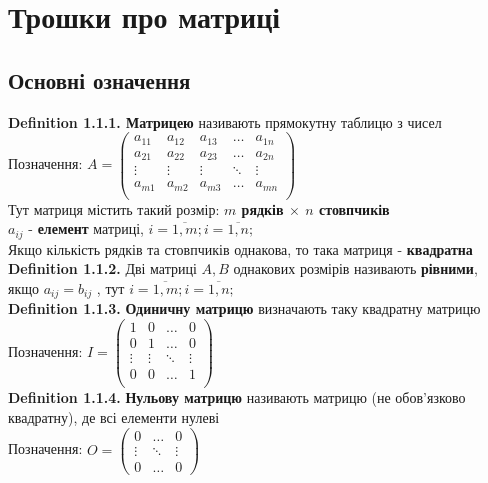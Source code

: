 \documentclass[a4paper, 10pt]{article}
\def\defin#1{\textbf{Definition {#1}}}
\theoremstyle{theoremdd}
\theoremstyle{theoremdd}
\theoremstyle{theoremdd}
\theoremstyle{theoremdd}
\theoremstyle{theoremdd}
\theoremstyle{theoremdd}
\theoremstyle{theoremdd}
\theoremstyle{theoremdd}
\begin{document}
\section{Трошки про матриці}
    	\subsection{Основні означення}
    	\defin{1.1.1. Матрицею} називають прямокутну таблицю з чисел\\
    	Позначення: $A = \begin{pmatrix}
    	a_{11} & a_{12} & a_{13} & \dots & a_{1n} \\
    	a_{21} & a_{22} & a_{23} & \dots & a_{2n} \\
    	\vdots & \vdots & \vdots & \ddots & \vdots\\
    	a_{m1} & a_{m2} & a_{m3} & \dots & a_{mn} \\
    	\end{pmatrix}$\\
    	Тут матриця містить такий розмір: \textbf{$m$ рядків $\times$ $n$ стовпчиків}\\
    	$a_{ij}$ - \textbf{елемент} матриці, $i=\overline{1,m}; i=\overline{1,n};$
    	\bigskip \\
    	Якщо кількість рядків та стовпчиків однакова, то така матриця - \textbf{квадратна}
    	\bigskip \\
    	\defin{1.1.2.} Дві матриці $A,B$ однакових розмірів називають \textbf{рівними}, якщо $a_{ij} = b_{ij}$ , тут $i=\overline{1,m}; i=\overline{1,n};$\bigskip \\
    	\defin{1.1.3.} \textbf{Одиничну матрицю} визначають таку квадратну матрицю\\
    	Позначення: $I = \begin{pmatrix}
    	1 & 0 & \dots & 0 \\
    	0 & 1 & \dots & 0 \\
    	\vdots & \vdots & \ddots & \vdots \\
    	0 & 0 & \dots & 1 \\
    	\end{pmatrix}$
    	\bigskip \\
    	\defin{1.1.4.} \textbf{Нульову матрицю} називають матрицю (не обов'язково квадратну), де всі елементи нулеві\\
    	Позначення: $O = \begin{pmatrix}
    	0 & \dots & 0 \\
    	\vdots & \ddots & \vdots \\
    	0 & \dots & 0
    	\end{pmatrix}$
\end{document}
